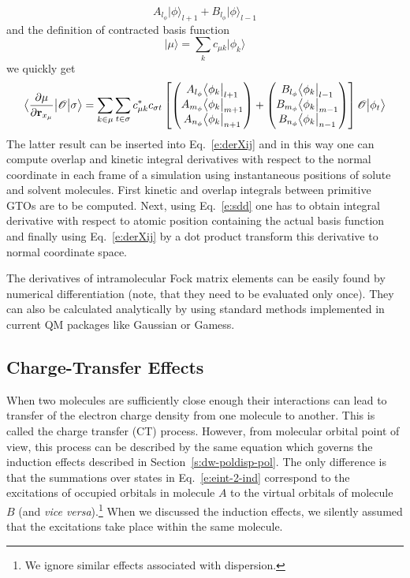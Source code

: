 \documentclass[a4paper,titlepage,twoside,fleqn,12pt]{book}
\newcommand{\bra}[1]{\ensuremath{\bigl\langle {#1} \bigl\lvert}}
\newcommand{\ket}[1]{\ensuremath{\bigr\rvert {#1} \bigr\rangle}}
\newcommand{\tbraket}[3]{\ensuremath{\bigl\langle {#1} \bigl\lvert {#2} \bigl\lvert {#3} \bigr\rangle}}
\newcommand{\fderiv}[2]{\ensuremath{
    \frac{\partial #1}{\partial #2}}}
\begin{document}
\begin{refsection}
\begin{equation}
A_{l_\phi}  \ket{\phi}_{l+1} + B_{l_\phi}  \ket{\phi}_{l-1}
\end{equation}
%
and the definition of contracted basis function
%
\begin{equation}\label{e:muorb}
\ket{\mu} = \sum_k c_{\mu k} \ket{\phi_k}
\end{equation}
%
we quickly get
%
\begin{equation}\label{e:sdd}
\tbraket{\fderiv{\mu}{{\bf r}_{x_\mu}}}{ \mathscr{O} }{\sigma} =
\sum_{k\in\mu}\sum_{t\in\sigma}
c_{\mu k}^*c_{\sigma t}
  \left[
  \begin{pmatrix}
  A_{l_\phi} \bra{\phi_k}_{l+1} \\ 
  A_{m_\phi} \bra{\phi_k}_{m+1} \\ 
  A_{n_\phi} \bra{\phi_k}_{n+1}
  \end{pmatrix}
+
  \begin{pmatrix}
  B_{l_\phi} \bra{\phi_k}_{l-1} \\ 
  B_{m_\phi} \bra{\phi_k}_{m-1} \\ 
  B_{n_\phi} \bra{\phi_k}_{n-1}
  \end{pmatrix}
  \right]
\mathscr{O}\ket{\phi_t}
\end{equation}
%
The latter result can be inserted into Eq.~\eqref{e:derXij} and in this way
one can compute overlap and kinetic integral derivatives with respect to the normal coordinate
in each frame of a simulation using instantaneous positions of solute and solvent molecules.
First kinetic and overlap integrals between primitive GTOs are to be computed. Next,
using Eq.~\eqref{e:sdd} one has to obtain integral derivative with respect to atomic position
containing the actual basis function and finally using Eq.~\eqref{e:derXij} by a dot product
transform this derivative to normal coordinate space.

The derivatives of intramolecular Fock matrix elements can be easily found
by numerical  differentiation (note, that they need to be evaluated only once).
They can also be calculated analytically by using standard methods implemented
in current QM packages like {\sc Gaussian} or {\sc Gamess}.

\subsection{Charge-Transfer Effects\label{s:dw-ct}}

When two molecules are sufficiently close enough
their interactions can lead to transfer of the 
electron charge density from one molecule to another.
This is called the charge transfer (CT) process.
However, from molecular orbital point of view, this process can be 
described by the same equation which governs the induction
effects described in Section~\ref{s:dw-poldisp-pol}. The only difference
is that the summations over states in Eq.~\eqref{e:eint-2-ind} correspond to 
the excitations of occupied orbitals in molecule $A$ to
the virtual orbitals of molecule $B$ (and \emph{vice versa}).\footnote{We ignore similar effects
associated with dispersion.} 
When we discussed the induction effects, we silently assumed that
the excitations take place within the same molecule. 


\end{refsection}
\end{document}
